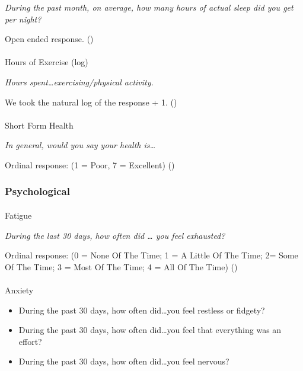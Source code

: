 \documentclass[
  single column]{article}
\makeatletter
\let\oldparagraph\paragraph
\renewcommand{\paragraph}{
    \@ifstar
      \xxxParagraphStar
      \xxxParagraphNoStar
  }
\newcommand{\xxxParagraphStar}[1]{\oldparagraph*{#1}\mbox{}}
\newcommand{\xxxParagraphNoStar}[1]{\oldparagraph{#1}\mbox{}}
\providecommand{\tightlist}{%
  \setlength{\itemsep}{0pt}\setlength{\parskip}{0pt}}\usepackage{longtable,booktabs,array}
\makeatother
\begin{document}
\emph{During the past month, on average, how many hours of actual sleep
did you get per night?}

Open ended response. ()

\paragraph{Hours of Exercise (log)}\label{hours-of-exercise-log-1}

\emph{Hours spent\ldots exercising/physical activity.}

We took the natural log of the response + 1.
()

\paragraph{Short Form Health}\label{short-form-health}

\emph{In general, would you say your health is\ldots{}}

Ordinal response: (1 = Poor, 7 = Excellent)
()

\subsubsection{Psychological}\label{psychological}

\paragraph{Fatigue}\label{fatigue}

\emph{During the last 30 days, how often did \ldots{} you feel
exhausted?}

Ordinal response: (0 = None Of The Time; 1 = A Little Of The Time; 2=
Some Of The Time; 3 = Most Of The Time; 4 = All Of The Time)
()

\paragraph{Anxiety}\label{anxiety}

\begin{itemize}
\tightlist
\item
  During the past 30 days, how often did\ldots you feel restless or
  fidgety?
\item
  During the past 30 days, how often did\ldots you feel that everything
  was an effort?
\item
  During the past 30 days, how often did\ldots you feel nervous?
\end{itemize}
\end{document}
